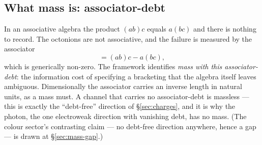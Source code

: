 \subsection{What mass is: associator-debt}

In an associative algebra the product $(ab)c$ equals $a(bc)$ and there is nothing to record. The
octonions are not associative, and the failure is measured by the associator
\begin{equation}
  [a,b,c] = (ab)c - a(bc),
\end{equation}
which is generically non-zero. The framework identifies \emph{mass with this associator-debt}: the
information cost of specifying a bracketing that the algebra itself leaves ambiguous. Dimensionally
the associator carries an inverse length in natural units, as a mass must. A channel that carries no
associator-debt is massless --- this is exactly the ``debt-free'' direction of \S\ref{sec:charges},
and it is why the photon, the one electroweak direction with vanishing debt, has no mass. (The
colour sector's contrasting claim --- no debt-free direction anywhere, hence a gap --- is drawn at
\S\ref{sec:mass-gap}.)

